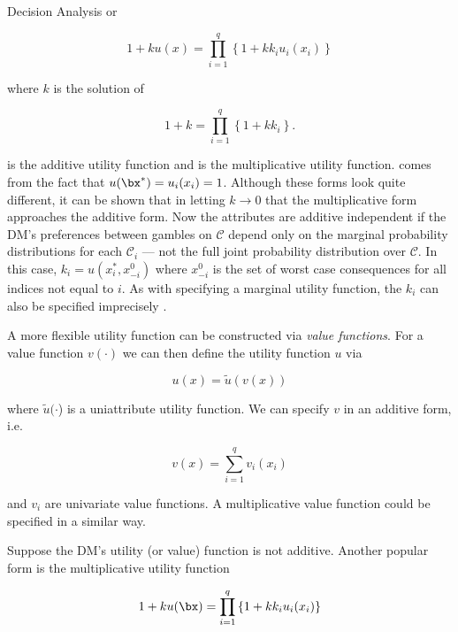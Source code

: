 \begin{chapter}{Decision Analysis \label{Ch:decision}}
or

\begin{equation}
	1 + k u(x) = \prod_{i=1}^q \left\{ 1 + k k_i u_i(x_i) \right\} \label{Eq:mult-u}
\end{equation}

where $k$ is the solution of 

\begin{equation}
	1 + k = \prod_{i=1}^q \left\{1 + k k_i \right\}.\label{Eq:k-soln}
\end{equation}



 is the additive utility function and  is the multiplicative utility function.  comes from the fact that $u(\bx^*) = u_i(x_i) = 1$. Although these forms look quite different, it can be shown that in letting $k \to 0$ that the multiplicative form approaches the additive form. Now the attributes are additive independent if the DM's preferences between gambles on $\mathcal{C}$ depend only on the marginal probability distributions for each $\mathcal{C}_i$ --- not the full joint probability distribution over $\mathcal{C}$. In this case, $k_i = u(x_i^*, x_{-i}^0)$ where $x_{-i}^0$ is the set of worst case consequences for all indices not equal to $i$. As with specifying a marginal utility function, the $k_i$ can also be specified imprecisely \citep{Farrow2009, Farrow2010}.

A more flexible utility function can be constructed via \textit{value functions}. For a value function $v(\cdot)$ we can then define the utility function $u$ via

\begin{equation}
	u(x) = \tilde{u}(v(x))
\end{equation}

where $\tilde{u}(\cdot$) is a uniattribute utility function. We can specify $v$ in an additive form, i.e.

\begin{equation}
	v(x) = \sum_{i=1}^q v_i (x_i)
\end{equation}

and $v_i$ are univariate value functions. A multiplicative value function could be specified in a similar way.

Suppose the DM's utility (or value) function is not additive. Another popular form is the multiplicative utility function

\begin{equation}
	1 + k u(\bx)  = \prod_{i=1}^q \left\{ 1 + k k_i u_i (x_i) \right\}
\end{equation}


\end{chapter}
